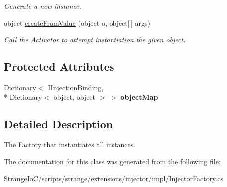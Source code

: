 \begin{DoxyCompactItemize}
\begin{DoxyCompactList}\small\item\em Generate a new instance. \end{DoxyCompactList}\item 
\hypertarget{classstrange_1_1extensions_1_1injector_1_1impl_1_1_injector_factory_a91f6e1072012692e9e43696b6d7ce41d}{object \hyperlink{classstrange_1_1extensions_1_1injector_1_1impl_1_1_injector_factory_a91f6e1072012692e9e43696b6d7ce41d}{create\-From\-Value} (object o, object\mbox{[}$\,$\mbox{]} args)}\label{classstrange_1_1extensions_1_1injector_1_1impl_1_1_injector_factory_a91f6e1072012692e9e43696b6d7ce41d}

\begin{DoxyCompactList}\small\item\em Call the Activator to attempt instantiation the given object. \end{DoxyCompactList}\end{DoxyCompactItemize}
\subsection*{Protected Attributes}
\begin{DoxyCompactItemize}
\item 
\hypertarget{classstrange_1_1extensions_1_1injector_1_1impl_1_1_injector_factory_a41ff79c05399567b47029445189c8d30}{Dictionary$<$ \hyperlink{interfacestrange_1_1extensions_1_1injector_1_1api_1_1_i_injection_binding}{I\-Injection\-Binding}, \\*
Dictionary$<$ object, object $>$ $>$ {\bfseries object\-Map}}\label{classstrange_1_1extensions_1_1injector_1_1impl_1_1_injector_factory_a41ff79c05399567b47029445189c8d30}

\end{DoxyCompactItemize}


\subsection{Detailed Description}
The Factory that instantiates all instances. 

The documentation for this class was generated from the following file\-:\begin{DoxyCompactItemize}
\item 
Strange\-Io\-C/scripts/strange/extensions/injector/impl/Injector\-Factory.\-cs\end{DoxyCompactItemize}
